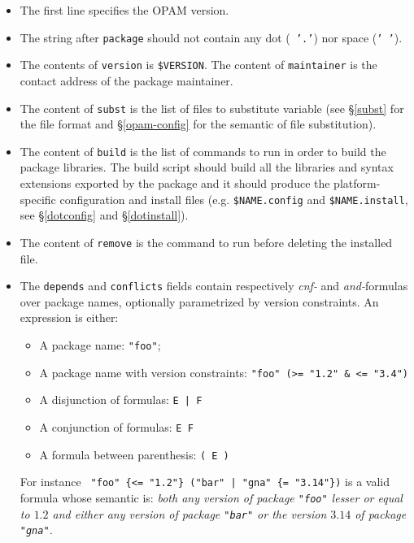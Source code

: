 \documentclass[a4paper,11pt]{article}
\begin{document}
\begin{itemize}

\item The first line specifies the OPAM version.

\item The string after {\tt package} should not contain any dot ({\tt
  '.'}) nor space ({\tt ' '}).

\item The contents of {\tt version} is \verb+$VERSION+. The content of
  {\tt maintainer} is the contact address of the package maintainer.

\item The content of {\tt subst} is the list of files to substitute
  variable (see \S\ref{subst} for the file format and
  \S\ref{opam-config} for the semantic of file substitution).

\item The content of {\tt build} is the list of commands to run in
  order to build the package libraries. The build script should build
  all the libraries and syntax extensions exported by the package and
  it should produce the platform-specific configuration and install
  files (e.g. \verb+$NAME.config+ and \verb+$NAME.install+, see
  \S\ref{dotconfig} and \S\ref{dotinstall}).

\item The content of {\tt remove} is the command to run before deleting
  the installed file.

\item The {\tt depends} and {\tt conflicts} fields contain
  respectively {\em cnf-} and {\em and-}formulas over package names,
  optionally parametrized by version constraints. An expression is
  either:

\begin{itemize}
\item A package name: {\tt "foo"};
\item A package name with version constraints:
  \verb+"foo" (>= "1.2" & <= "3.4")+
\item A disjunction of formulas: \verb+E | F+
\item A conjunction of formulas: \verb+E F+
\item A formula between parenthesis: \verb+( E )+
\end{itemize}

For instance \verb+ "foo" {<= "1.2"} ("bar" | "gna" {= "3.14"})+ is a
valid formula whose semantic is: {\em both any version of package
  {\tt "foo"} lesser or equal to $1.2$ and either any version of package
  {\tt "bar"} or the version $3.14$ of package {\tt "gna"}.}  \\


\end{itemize}
\end{document}
